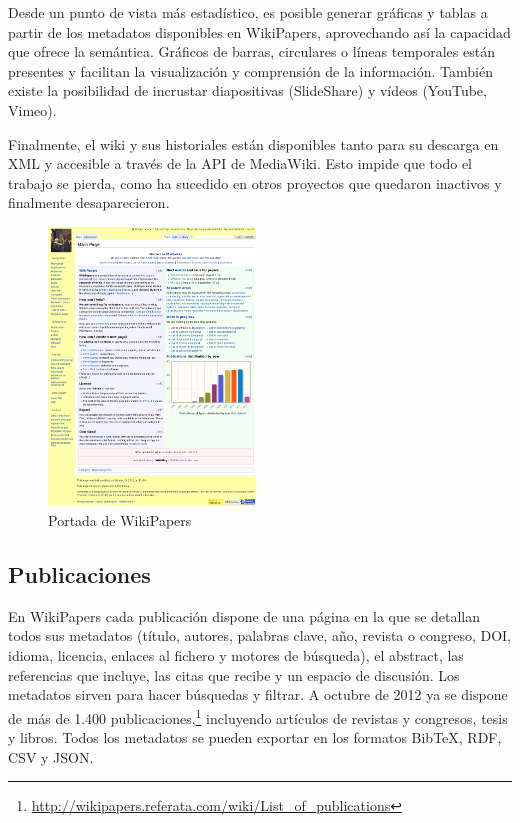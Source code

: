 \documentclass[11pt,twocolumn]{article}
\begin{document}
Desde un punto de vista más estadístico, es posible generar gráficas y tablas a partir de los metadatos disponibles en WikiPapers, aprovechando así la capacidad que ofrece la semántica. Gráficos de barras, circulares o líneas temporales están presentes y facilitan la visualización y comprensión de la información. También existe la posibilidad de incrustar diapositivas (SlideShare) y vídeos (YouTube, Vimeo).

Finalmente, el wiki y sus historiales están disponibles tanto para su descarga en XML y accesible a través de la API de MediaWiki. Esto impide que todo el trabajo se pierda, como ha sucedido en otros proyectos que quedaron inactivos y finalmente desaparecieron.

\begin{figure}[htb]
\centering
\includegraphics[width=0.49\textwidth]{wpfull.png}
\caption{Portada de WikiPapers}
\label{fig:wpfull}
\end{figure}

\subsection{Publicaciones}
En WikiPapers cada publicación dispone de una página en la que se detallan todos sus metadatos (título, autores, palabras clave, año, revista o congreso, DOI, idioma, licencia, enlaces al fichero y motores de búsqueda), el abstract, las referencias que incluye, las citas que recibe y un espacio de discusión. Los metadatos sirven para hacer búsquedas y filtrar. A octubre de 2012 ya se dispone de más de 1.400 publicaciones,\footnote{\href{http://wikipapers.referata.com/wiki/List_of_publications}{http://wikipapers.referata.com/wiki/List\_of\_publications}} incluyendo artículos de revistas y congresos, tesis y libros. Todos los metadatos se pueden exportar en los formatos BibTeX, RDF, CSV y JSON.
\end{document}
